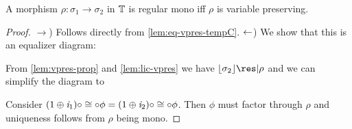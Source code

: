 \begin{lemma}\label{lem:rmono-vpres-tempC}
   A morphism $\rho : \sigma_1 \to \sigma_2$ in $\mathbb{T}$ is regular mono iff $\rho$ is variable preserving. 
\end{lemma}
\begin{proof}
    \nl
    $\to$) Follows directly from \cref{lem:eq-vpres-tempC}.
    \nl
    $\leftarrow$)
    We show that this is an equalizer diagram: 
    \begin{center}
    \end{center}
    
    From \cref{lem:vpres-prop} and \cref{lem:lic-vpres} we have $\concL{\sigma_2}\res|\rho$ and we can simplify the diagram to
    \begin{center}
    \end{center}
    Consider $(1 \oplus \mathit{i}_1) \circ \cong \circ \phi = (1 \oplus \mathit{i}_2) \circ \cong \circ \phi$. Then $\phi$ must factor through $\rho$ and uniqueness follows from $\rho$ being mono.
\end{proof}

